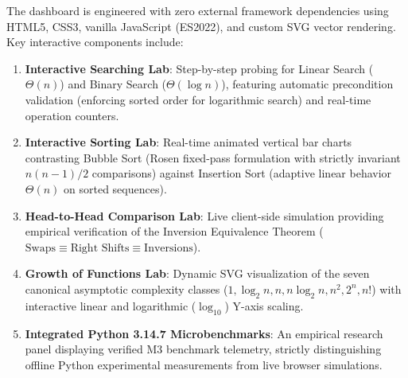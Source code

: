 The dashboard is engineered with zero external framework dependencies using HTML5, CSS3, vanilla JavaScript (ES2022), and custom SVG vector rendering. Key interactive components include:
\begin{enumerate}
    \item \textbf{Interactive Searching Lab}: Step-by-step probing for Linear Search ($\Theta(n)$) and Binary Search ($\Theta(\log n)$), featuring automatic precondition validation (enforcing sorted order for logarithmic search) and real-time operation counters.
    \item \textbf{Interactive Sorting Lab}: Real-time animated vertical bar charts contrasting Bubble Sort (Rosen fixed-pass formulation with strictly invariant $n(n-1)/2$ comparisons) against Insertion Sort (adaptive linear behavior $\Theta(n)$ on sorted sequences).
    \item \textbf{Head-to-Head Comparison Lab}: Live client-side simulation providing empirical verification of the Inversion Equivalence Theorem ($\text{Swaps} \equiv \text{Right Shifts} \equiv \text{Inversions}$).
    \item \textbf{Growth of Functions Lab}: Dynamic SVG visualization of the seven canonical asymptotic complexity classes ($1, \log_2 n, n, n \log_2 n, n^2, 2^n, n!$) with interactive linear and logarithmic ($\log_{10}$) Y-axis scaling.
    \item \textbf{Integrated Python 3.14.7 Microbenchmarks}: An empirical research panel displaying verified M3 benchmark telemetry, strictly distinguishing offline Python experimental measurements from live browser simulations.
\end{enumerate}
